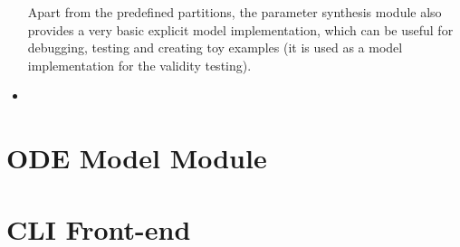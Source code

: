 \begin{itemize}
	Apart from the predefined partitions, the parameter synthesis module also provides a very basic explicit model implementation, which can be useful for debugging, testing and creating toy examples (it is used as a model implementation for the validity testing).

	\item 
\end{itemize}

\section{ODE Model Module}



\section{CLI Front-end}